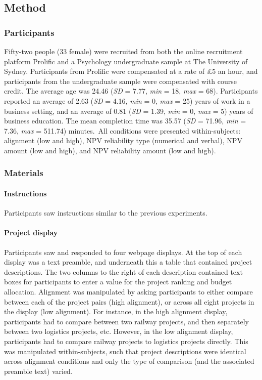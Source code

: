 \documentclass[a4paper, nobind, dvipsnames]{templates/ociamthesis}
\theoremstyle{definition}
\theoremstyle{definition}
\theoremstyle{definition}
\theoremstyle{definition}
\theoremstyle{remark}
\begin{document}
\subsection{Method}

\subsubsection{Participants}

Fifty-two people (33 female) were recruited from both the online recruitment platform Prolific and a Psychology undergraduate sample at The University of Sydney. Participants from Prolific were compensated at a rate of £5 an hour, and participants from the undergraduate sample were compensated with course credit. The average age was 24.46 (\emph{SD} = 7.77, \emph{min} = 18, \emph{max} = 68). Participants reported an average of 2.63 (\emph{SD} = 4.16, \emph{min} = 0, \emph{max} = 25) years of work in a business setting, and an average of 0.81 (\emph{SD} = 1.39, \emph{min} = 0, \emph{max} = 5) years of business education. The mean completion time was 35.57 (\emph{SD} = 71.96, \emph{min} = 7.36, \emph{max} = 511.74) minutes.~All conditions were presented within-subjects:
alignment (low and high), NPV reliability type (numerical and verbal), NPV
amount (low and high), and NPV reliability amount (low and high).

\subsubsection{Materials}

\paragraph{Instructions}

Participants saw instructions similar to the previous experiments.

\paragraph{Project display}

Participants saw and responded to four webpage displays. At the top of each
display was a text preamble, and underneath this a table that contained project
descriptions. The two columns to the right of each description contained text
boxes for participants to enter a value for the project ranking and budget
allocation. Alignment was manipulated by asking participants to either compare
between each of the project pairs (high alignment), or across all eight projects
in the display (low alignment). For instance, in the high alignment display,
participants had to compare between two railway projects, and then separately
between two logistics projects, etc. However, in the low alignment display,
participants had to compare railway projects to logistics projects directly.
This was manipulated within-subjects, such that project descriptions were
identical across alignment conditions and only the type of comparison (and the
associated preamble text) varied.
\end{document}
